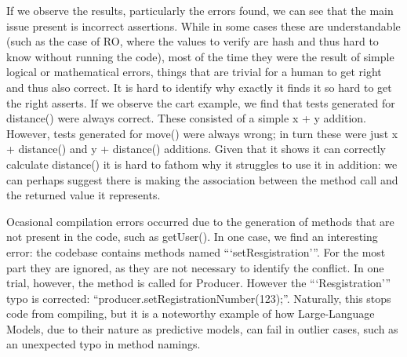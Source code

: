 If we observe the results, particularly the errors found, we can see that the main issue present
is incorrect assertions. While in some cases these are understandable (such as the case of RO,
where the values to verify are hash and thus hard to know without running the code), most of the time
they were the result of simple logical or mathematical errors, things that are trivial for a human to get right
and thus also correct.
It is hard to identify why exactly it finds it so hard to get the right asserts. If we observe the cart example,
we find that tests generated for distance() were always correct. These consisted of a simple x + y addition.
However, tests generated for move() were always wrong; in turn these were just x + distance() and y + distance() additions.
Given that it shows it can correctly calculate distance() it is hard to fathom why it struggles
to use it in addition: we can perhaps suggest there is making the association between the method call and the returned value it represents.

Ocasional compilation errors occurred due to the generation of methods that are not present in the code, such as getUser().
In one case, we find an interesting error: the codebase contains methods named ```setResgistration'''.
For the most part they are ignored, as they are not necessary to identify the conflict. In one trial, however,
the method is called for Producer. However the ```Resgistration''' typo is corrected: ``producer.setRegistrationNumber(123);''.
Naturally, this stops code from compiling, but it is a noteworthy example of how Large-Language Models, due to their nature as 
predictive models, can fail in outlier cases, such as an unexpected typo in method namings.

